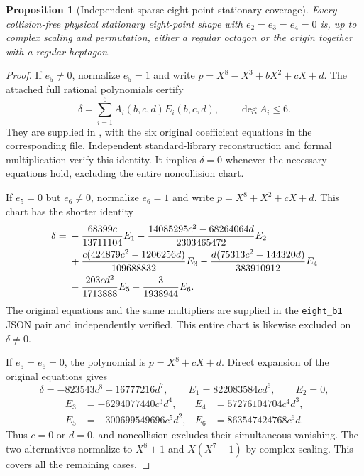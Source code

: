 \documentclass[11pt]{article}
\newtheorem{proposition}[theorem]{Proposition}
\theoremstyle{remark}
\numberwithin{equation}{section}
\begin{document}
\begin{proposition}[Independent sparse eight-point stationary coverage]
\label{prop:eight-sparse-coverage}
Every collision-free physical stationary eight-point shape with
$e_2=e_3=e_4=0$ is, up to complex scaling and permutation, either a
regular octagon or the origin together with a regular heptagon.
\end{proposition}
\begin{proof}
If $e_5\ne0$, normalize $e_5=1$ and write
$p=X^8-X^3+bX^2+cX+d$. The attached full rational polynomials certify
\begin{equation}\label{eq:eight-first-e5-collision}
 \delta=\sum_{i=1}^6 A_i(b,c,d)E_i(b,c,d),\qquad \deg A_i\le6.
\end{equation}
They are supplied in
, with the six original
coefficient equations in the corresponding
 file. Independent standard-library
reconstruction and formal multiplication verify this identity. It implies
$\delta=0$ whenever the necessary equations hold, excluding the
entire noncollision chart.

If $e_5=0$ but $e_6\ne0$, normalize $e_6=1$ and write
$p=X^8+X^2+cX+d$. This chart has the shorter identity
\begin{align}
 \delta={}&-\frac{68399c}{13711104}E_1
 -\frac{14085295c^2-68264064d}{2303465472}E_2\notag\\
 &+\frac{c(424879c^2-1206256d)}{109688832}E_3
 -\frac{d(75313c^2+144320d)}{383910912}E_4\notag\\
 &-\frac{203cd^2}{1713888}E_5-\frac3{1938944}E_6.
 \label{eq:eight-first-e6-collision}
\end{align}
The original equations and the same multipliers are supplied in the
\texttt{eight\_b1} JSON pair and independently verified. This entire
chart is likewise excluded on $\delta\ne0$.

If $e_5=e_6=0$, the polynomial is $p=X^8+cX+d$. Direct expansion of
the original equations gives
\[
 \delta=-823543c^8+16777216d^7,\qquad
 E_1=822083584cd^6,\qquad E_2=0,
\]
\[
 \begin{aligned}
 E_3&=-6294077440c^3d^4,& E_4&=57276104704c^4d^3,\\
 E_5&=-300699549696c^5d^2,& E_6&=863547424768c^6d.
 \end{aligned}
\]
Thus $c=0$ or $d=0$, and noncollision excludes their simultaneous
vanishing. The two alternatives normalize to $X^8+1$ and
$X(X^7-1)$ by complex scaling. This covers all the remaining cases.
\end{proof}
\end{document}
